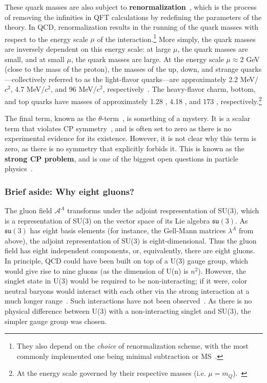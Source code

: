 These quark masses are also subject to \textbf{renormalization}~\cite{MassRenorm}, which is the process of removing the infinities in QFT calculations by redefining the parameters of the theory. In QCD, renormalization results in the running of the quark masses with respect to the energy scale $\mu$ of the interaction.\footnote{They also depend on the \textit{choice} of renormalization scheme, with the most commonly implemented one being minimal subtraction or MS~\cite{MSScheme}.} More simply, the quark masses are inversely dependent on this energy scale: at large $\mu$, the quark masses are small, and at small $\mu$, the quark masses are large. At the energy scale $\mu \approx 2$ GeV (close to the mass of the proton), the masses of the up, down, and strange quarks---collectively referred to as the light-flavor quarks---are approximately 2.2 MeV/$c^2$, 4.7 MeV/$c^2$, and 96 MeV/$c^2$, respectively~\cite{PDG}. The heavy-flavor charm, bottom, and top quarks have masses of approximately 1.28 \GeVmass, 4.18 \GeVmass, and 173 \GeVmass, respectively.\footnote{At the energy scale governed by their respective masses (i.e. $\mu = m_{Q}$).~\cite{PDG}} 

The final term, known as the $\theta$-term~\cite{ThetaTerm}, is something of a mystery. It is a scalar term that violates CP symmetry~\cite{CPSymmetry}, and is often set to zero as there is no experimental evidence for its existence. However, it is not clear why this term is zero, as there is no symmetry that explicitly forbids it. This is known as the \textbf{strong CP problem}, and is one of the biggest open questions in particle physics~\cite{StrongCPProblem}. 


\subsubsection{Brief aside: Why eight gluons?}
\label{sec:why_eight_gluons}

The gluon field $\mathcal{A}^A$ transforms under the adjoint respresentation of SU(3), which is a representation of SU(3) on the vector space of its Lie algebra $\mathfrak{su}(3)$. As $\mathfrak{su}(3)$ has eight basis elements (for instance, the Gell-Mann matrices $\lambda^A$ from above), the adjoint representation of SU(3) is eight-dimensional. Thus the gluon field has eight independent components, or, equivalently, there are eight gluons. In principle, QCD could have been built on top of a U(3) gauge group, which would give rise to nine gluons (as the dimension of U(n) is $n^2$). However, the singlet state in U(3) would be required to be non-interacting; if it were, color neutral baryons would interact with each other via the strong interaction at a much longer range~\cite{SingletGluons}. Such interactions have not been observed~\cite{SingletGluons2}. As there is no physical difference between U(3) with a non-interacting singlet and SU(3), the simpler gauge group was chosen. 


